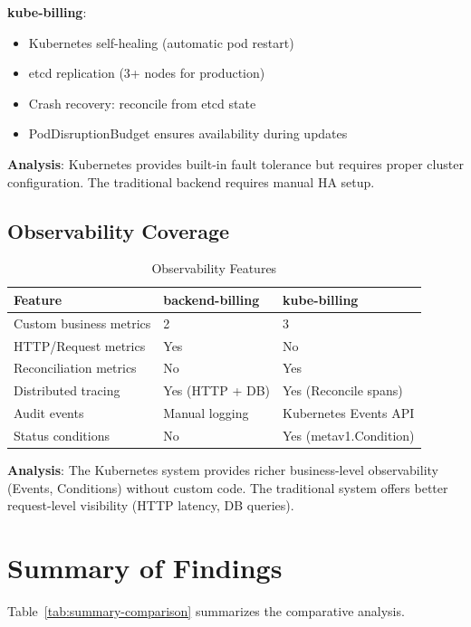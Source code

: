\textbf{kube-billing}:
\begin{itemize}
    \item Kubernetes self-healing (automatic pod restart)
    \item etcd replication (3+ nodes for production)
    \item Crash recovery: reconcile from etcd state
    \item PodDisruptionBudget ensures availability during updates
\end{itemize}

\textbf{Analysis}: Kubernetes provides built-in fault tolerance but requires proper cluster configuration. The traditional backend requires manual HA setup.

\subsection{Observability Coverage}

\begin{table}[h]
\centering
\small
\caption{Observability Features}
\label{tab:observability}
\begin{tabularx}{\textwidth}{@{}lXX@{}}
\toprule
\textbf{Feature} & \textbf{backend-billing} & \textbf{kube-billing} \\ \midrule
Custom business metrics & 2 & 3 \\
HTTP/Request metrics & Yes & No \\
Reconciliation metrics & No & Yes \\
Distributed tracing & Yes (HTTP + DB) & Yes (Reconcile spans) \\
Audit events & Manual logging & Kubernetes Events API \\
Status conditions & No & Yes (metav1.Condition) \\ \bottomrule
\end{tabularx}
\end{table}

\textbf{Analysis}: The Kubernetes system provides richer business-level observability (Events, Conditions) without custom code. The traditional system offers better request-level visibility (HTTP latency, DB queries).

\section{Summary of Findings}

Table~\ref{tab:summary-comparison} summarizes the comparative analysis.

